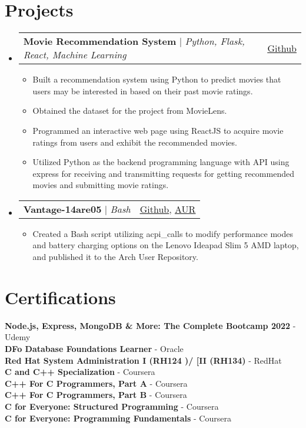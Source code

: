 \documentclass[a4paper,11pt]{article}
\makeatletter
\newcommand{\resumeItem}[1]{
    \item\small{
        {#1 \vspace{-4pt}}
    }
}
\newcommand{\resumeProjectHeading}[2]{
    \item
    \begin{tabular*}{0.97\textwidth}{l@{\extracolsep{\fill}}r}
        \small#1 & #2 \\
    \end{tabular*}\vspace{-7pt}
}
\newcommand{\resumeSubHeadingListStart}{\begin{itemize}[leftmargin=0.15in, label={}]}
\newcommand{\resumeSubHeadingListEnd}{\end{itemize}}
\newcommand{\resumeItemListStart}{\begin{itemize}}
\newcommand{\resumeItemListEnd}{\end{itemize}\vspace{-5pt}}
\makeatother
\begin{document}
\section{Projects}
\resumeSubHeadingListStart
\resumeProjectHeading
{\textbf{Movie Recommendation System} $|$ \emph{Python, Flask, React, Machine Learning}}{\href{https://github.com/ayushjaipuriyar/movie-recommendation-engine}{\underline{Github}}}
\resumeItemListStart
\resumeItem {Built a recommendation system using Python to predict movies that users may be interested in based on their past movie ratings.}
\resumeItem {Obtained the dataset for the project from MovieLens.}
\resumeItem {Programmed an interactive web page using ReactJS to acquire movie ratings from users and exhibit the recommended movies.}
\resumeItem {Utilized Python as the backend programming language with API using express for receiving and transmitting requests for getting recommended movies and submitting movie ratings.}
\resumeItemListEnd
\resumeProjectHeading
{\textbf{Vantage-14are05} $|$ \emph{Bash}}
{
    \href{https://github.com/ayushjaipuriyar/vantage-14are05}{\underline{Github}},
    \href{https://aur.archlinux.org/packages/vantage-14are05-git}{\underline{AUR}}
}
\resumeItemListStart
\resumeItem {Created a Bash script utilizing acpi\_calls to modify performance modes and battery charging options on the Lenovo Ideapad Slim 5 AMD laptop, and published it to the Arch User Repository.}
\resumeItemListEnd
\resumeSubHeadingListEnd




\section{Certifications}
\begin{itemize}[leftmargin=0.15in, label={}]
    \small{\item{
                    \textbf{Node.js, Express, MongoDB \& More: The Complete Bootcamp 2022}{ - Udemy} \\
                    \textbf{DFo Database Foundations Learner}{ - Oracle} \\
                    \textbf{Red Hat System Administration I (RH124 )/ [II (RH134)}{ - RedHat} \\
                    \textbf{C and C++ Specialization}{ - Coursera}\\
                    \textbf{C++ For C Programmers, Part A}{ - Coursera} \\
                    \textbf{C++ For C Programmers, Part B}{ - Coursera}\\
                    \textbf{C for Everyone: Structured Programming}{ - Coursera} \\
                    \textbf{C for Everyone: Programming Fundamentals}{ - Coursera}
              }
    }
\end{itemize}

\end{document}
